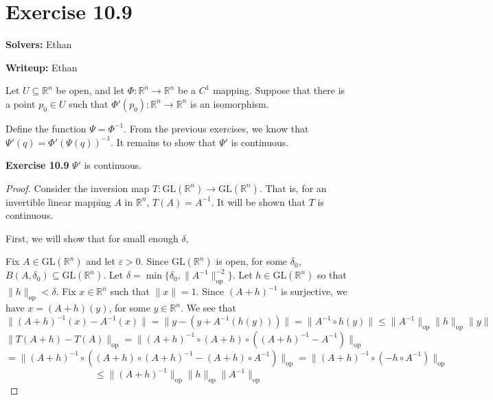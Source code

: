 \documentclass{article}
\newcommand{\op}{\mathrm{op}}
\newcommand{\GL}{\mathrm{GL}}
\theoremstyle{plain} %
\numberwithin{thm}{section} %
\theoremstyle{definition}
\begin{document}
    \section*{Exercise 10.9}
    \textbf{Solvers:} Ethan

    \noindent\textbf{Writeup:} Ethan

    Let \(U \subseteq \mathbb{R}^n\) be open, and let \(\Phi : \mathbb{R}^n \to \mathbb{R}^n\) be a \(C^1\) mapping. Suppose that there is a point \(p_0 \in U\) such that \(\Phi '(p_0) : \mathbb{R}^n \to \mathbb{R}^n\) is an isomorphism.

    \medskip

    Define the function \(\Psi = \Phi ^{-1}\). From the previous exercises, we know that \(\Psi '(q) = \Phi '(\Psi (q)) ^{-1}\). It remains to show that \(\Psi '\) is continuous.

    \noindent\textbf{Exercise 10.9} \(\Psi '\) is continuous.

    \begin{proof}
        Consider the inversion map \(T : \GL(\mathbb{R}^n) \to \GL(\mathbb{R}^n)\). That is, for an invertible linear mapping \(A\) in \(\mathbb{R}^n\), \(T(A) = A^{-1}\). It will be shown that \(T\) is continuous.

        First, we will show that for small enough \(\delta\), \(\) 

        Fix \(A \in \GL(\mathbb{R}^n)\) and let \(\varepsilon > 0\). Since \(\GL(\mathbb{R}^n)\) is open, for some \(\delta _0\), \(B(A, \delta _0) \subseteq \GL(\mathbb{R}^n)\). Let \(\delta = \min \{\delta _0, \|A^{-1}\| _{\op}^{-2}\}\). Let \(h \in \GL(\mathbb{R}^n)\) so that \(\|h\| _{\op} < \delta\). Fix \(x \in \mathbb{R}^n\) such that \(\|x\| = 1\). Since \((A + h)^{-1}\) is surjective, we have \(x = (A+h) (y)\), for some \(y \in \mathbb{R}^n\). We see that
        \[
            \|(A + h)^{-1} (x) - A^{-1} (x)\| = \|y - (y + A^{-1}(h(y)))\| = \|A^{-1} \circ h (y)\| \leq \|A^{-1}\| _{\op} \|h\| _{\op} \|y\|
        \]
        \[
            \|T(A + h) - T(A)\|_{\op} = \|(A+h)^{-1} \circ (A+h) \circ ((A+h)^{-1} - A^{-1})\|_{\op}
        \]
        \[
            = \|(A+h)^{-1} \circ ((A+h)\circ (A+h)^{-1} - (A+h) \circ A^{-1})\|_{\op} = \|(A+h)^{-1} \circ (- h \circ A^{-1})\|_{\op}
        \]
        \[
            \leq \|(A+h)^{-1}\|_{\op} \|h\|_{\op} \|A^{-1}\|_{\op}
        \]
    \end{proof}
\end{document}
